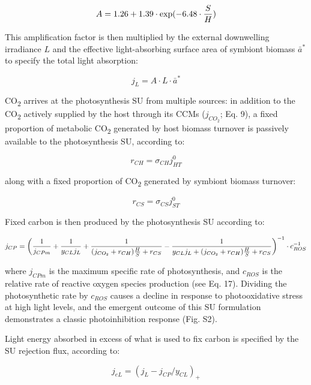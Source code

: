 \documentclass[]{elsarticle} %
\begin{document}
\begin{equation} A = 1.26 + 1.39 \cdot \exp(-6.48 \cdot {S \over H}) \end{equation}

This amplification factor is then multiplied by the external downwelling
irradiance \(L\) and the effective light-absorbing surface area of
symbiont biomass \(\bar{a}^*\) to specify the total light absorption:

\begin{equation} j_L =  A \cdot L \cdot \bar{a}^* \end{equation}

CO\textsubscript{2} arrives at the photosynthesis SU from multiple
sources: in addition to the CO\textsubscript{2} actively supplied by the
host through its CCMs (\(j_{CO_2}\); Eq. 9), a fixed proportion of
metabolic CO\textsubscript{2} generated by host biomass turnover is
passively available to the photosynthesis SU, according to:

\begin{equation} r_{CH}=\sigma_{CH}j_{HT}^0 \end{equation}

along with a fixed proportion of CO\textsubscript{2} generated by
symbiont biomass turnover:

\begin{equation} r_{CS}=\sigma_{CS}j_{ST}^0 \end{equation}

Fixed carbon is then produced by the photosynthesis SU according to:

\begin{equation} j_{CP} = \bigg({1 \over j_{CPm}} + {1 \over {y_{CL} j_L }} + {1 \over {(j_{CO_2} + r_{CH}){H \over S} + r_{CS}}} - {1 \over {y_{CL} j_L + (j_{CO_2} + r_{CH}){H \over S} + r_{CS}}}\bigg)^{-1} \cdot c_{ROS}^{-1} \end{equation}

where \(j_{CPm}\) is the maximum specific rate of photosynthesis, and
\(c_{ROS}\) is the relative rate of reactive oxygen species production
(see Eq. 17). Dividing the photosynthetic rate by \(c_{ROS}\) causes a
decline in response to photooxidative stress at high light levels, and
the emergent outcome of this SU formulation demonstrates a classic
photoinhibition response (Fig. S2).

Light energy absorbed in excess of what is used to fix carbon is
specified by the SU rejection flux, according to:

\begin{equation} j_{eL} = (j_L - j_{CP} / y_{CL})_+ \end{equation}
\end{document}
